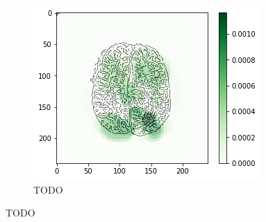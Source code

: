 \begin{figure}[H]
\begin{subfigure}{.33\textwidth}
        \includegraphics[width=\linewidth]{chapters/06_hdm/circle20/4.png}
        \caption{TODO}
    \end{subfigure}
    \caption{TODO}
\end{figure}

